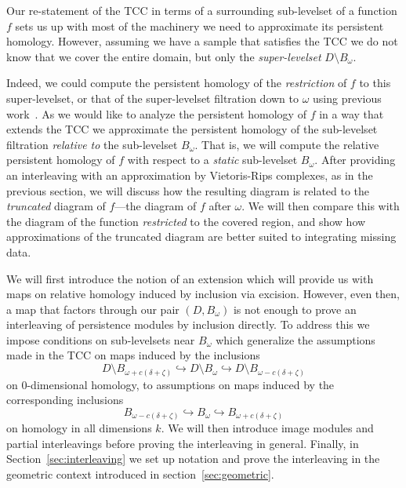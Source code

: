 
Our re-statement of the TCC in terms of a surrounding sub-levelset of a function $f$ sets us up with most of the machinery we need to approximate its persistent homology.
However, assuming we have a sample that satisfies the TCC we do not know that we cover the entire domain, but only the \emph{super-levelset} $D\setminus B_\omega$.

Indeed, we could compute the persistent homology of the \emph{restriction} of $f$ to this super-levelset, or that of the super-levelset filtration down to $\omega$ using previous work~\cite{chazal09analysis}.
As we would like to analyze the persistent homology of $f$ in a way that extends the TCC we approximate the persistent homology of the sub-levelset filtration \emph{relative to} the sub-levelset $B_\omega$.
That is, we will compute the relative persistent homology of $f$ with respect to a \emph{static} sub-levelset $B_\omega$.
After providing an interleaving with an approximation by Vietoris-Rips complexes, as in the previous section, we will discuss how the resulting diagram is related to the \emph{truncated} diagram of $f$---the diagram of $f$ after $\omega$.
We will then compare this with the diagram of the function \emph{restricted} to the covered region, and show how approximations of the truncated diagram are better suited to integrating missing data.


We will first introduce the notion of an extension which will provide us with maps on relative homology induced by inclusion via excision.
However, even then, a map that factors through our pair $(D, B_\omega)$ is not enough to prove an interleaving of persistence modules by inclusion directly.
To address this we impose conditions on sub-levelsets near $B_\omega$ which generalize the assumptions made in the TCC on maps induced by the inclusions
\[ D\setminus B_{\omega+c(\delta+\zeta)}\hookrightarrow D\setminus B_\omega\hookrightarrow D\setminus B_{\omega-c(\delta+\zeta)}\]
on $0$-dimensional homology, to assumptions on maps induced by the corresponding inclusions
\[ B_{\omega-c(\delta+\zeta)}\hookrightarrow B_\omega\hookrightarrow B_{\omega+c(\delta+\zeta)}\]
on homology in all dimensions $k$.
We will then introduce image modules and partial interleavings before proving the interleaving in general.
Finally, in Section~\ref{sec:interleaving} we set up notation and prove the interleaving in the geometric context introduced in section~\ref{sec:geometric}.
